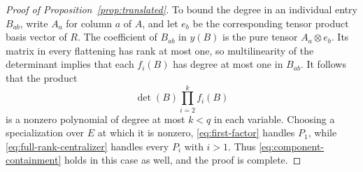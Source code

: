 \documentclass[10pt,a4paper]{amsart}
\theoremstyle{plain}
\theoremstyle{definition}
\theoremstyle{remark}
\begin{document}
\begin{proof}[Proof of Proposition~\ref{prop:translated}]
To bound the degree in an individual entry $B_{ab}$, write $A_a$ for column $a$ of $A$,
and let $e_b$ be the corresponding tensor product basis vector of $R$.
The coefficient of $B_{ab}$ in $y(B)$ is the pure tensor $A_a\otimes e_b$.
Its matrix in every flattening has rank at most one, so multilinearity of the determinant implies that each \(f_i(B)\) has degree at most one in \(B_{ab}\).
It follows that the product
\[
    \det(B) \prod_{i=2}^k f_i(B)
\]
is a nonzero polynomial of degree at most $k<q$ in each variable.
Choosing a specialization over $E$ at which it is nonzero,
\eqref{eq:first-factor} handles $P_1$,
while \eqref{eq:full-rank-centralizer} handles every $P_i$ with $i>1$.
Thus \eqref{eq:component-containment} holds in this case as well,
and the proof is complete.
\end{proof}
\end{document}
